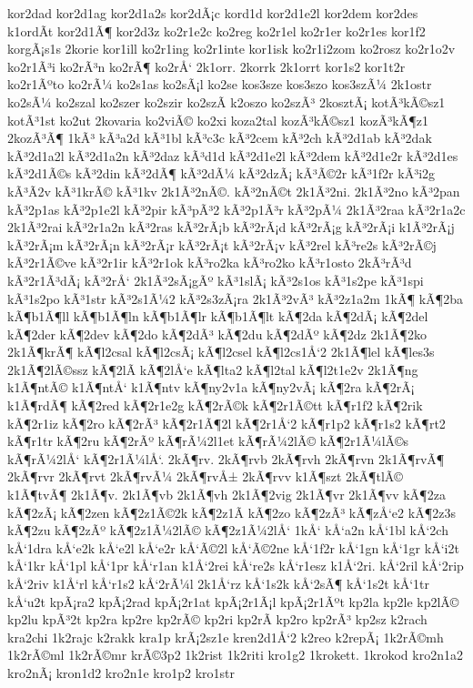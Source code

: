 {kor2dad
kor2d1ag
kor2d1a2s
kor2dÃ¡c
kord1d
kor2d1e2l
kor2dem
kor2des
k1ordÃ­t
kor2d1Ã¶
kor2d3z
ko2r1e2c
ko2reg
ko2r1el
ko2r1er
ko2r1es
kor1f2
korgÃ¡s1s
2korie
kor1ill
ko2r1ing
ko2r1inte
kor1isk
ko2r1i2zom
ko2rosz
ko2r1o2v
ko2r1Ã³i
ko2rÃ³n
ko2rÃ¶
ko2rÅ‘
2k1orr.
2korrk
2k1orrt
kor1s2
kor1t2r
ko2r1Ãºto
ko2rÃ¼
ko2s1as
ko2sÃ¡l
ko2se
kos3sze
kos3szo
kos3szÃ¼
2k1ostr
ko2sÃ¼
ko2szal
ko2szer
ko2szir
ko2szÃ­
k2oszo
ko2szÃ³
2kosztÃ¡
kotÃ³kÃ©sz1
kotÃ³1st
ko2ut
2kovaria
ko2viÃ©
ko2xi
koza2tal
kozÃ³kÃ©sz1
kozÃ³kÃ¶z1
2kozÃ³Ã¶
1kÃ³
kÃ³a2d
kÃ³1bl
kÃ³c3c
kÃ³2cem
kÃ³2ch
kÃ³2d1ab
kÃ³2dak
kÃ³2d1a2l
kÃ³2d1a2n
kÃ³2daz
kÃ³d1d
kÃ³2d1e2l
kÃ³2dem
kÃ³2d1e2r
kÃ³2d1es
kÃ³2d1Ã©s
kÃ³2din
kÃ³2dÃ¶
kÃ³2dÃ¼
kÃ³2dzÃ¡
kÃ³Ã©2r
kÃ³1f2r
kÃ³i2g
kÃ³Ã­2v
kÃ³1krÃ©
kÃ³1kv
2k1Ã³2nÃ©.
kÃ³2nÃ©t
2k1Ã³2ni.
2k1Ã³2no
kÃ³2pan
kÃ³2p1as
kÃ³2p1e2l
kÃ³2pir
kÃ³pÃ³2
kÃ³2p1Ã³r
kÃ³2pÃ¼
2k1Ã³2raa
kÃ³2r1a2c
2k1Ã³2rai
kÃ³2r1a2n
kÃ³2ras
kÃ³2rÃ¡b
kÃ³2rÃ¡d
kÃ³2rÃ¡g
kÃ³2rÃ¡i
k1Ã³2rÃ¡j
kÃ³2rÃ¡m
kÃ³2rÃ¡n
kÃ³2rÃ¡r
kÃ³2rÃ¡t
kÃ³2rÃ¡v
kÃ³2rel
kÃ³re2s
kÃ³2rÃ©j
kÃ³2r1Ã©ve
kÃ³2r1ir
kÃ³2r1ok
kÃ³ro2ka
kÃ³ro2ko
kÃ³r1osto
2kÃ³rÃ³d
kÃ³2r1Ã³dÃ¡
kÃ³2rÅ‘
2k1Ã³2sÃ¡gÃº
kÃ³1slÃ¡
kÃ³2s1os
kÃ³1s2pe
kÃ³1spi
kÃ³1s2po
kÃ³1str
kÃ³2s1Ã¼2
kÃ³2s3zÃ¡ra
2k1Ã³2vÃ³
kÃ³2z1a2m
1kÃ¶
kÃ¶2ba
kÃ¶b1Ã¶ll
kÃ¶b1Ã¶ln
kÃ¶b1Ã¶lr
kÃ¶b1Ã¶lt
kÃ¶2da
kÃ¶2dÃ¡
kÃ¶2del
kÃ¶2der
kÃ¶2dev
kÃ¶2do
kÃ¶2dÃ³
kÃ¶2du
kÃ¶2dÃº
kÃ¶2dz
2k1Ã¶2ko
2k1Ã¶krÃ¶
kÃ¶l2csal
kÃ¶l2csÃ¡
kÃ¶l2csel
kÃ¶l2cs1Å‘2
2k1Ã¶lel
kÃ¶les3s
2k1Ã¶2lÃ©ssz
kÃ¶2lÃ­
kÃ¶2lÅ‘e
kÃ¶lta2
kÃ¶l2tal
kÃ¶l2t1e2v
2k1Ã¶ng
k1Ã¶ntÃ©
k1Ã¶ntÅ‘
k1Ã¶ntv
kÃ¶ny2v1a
kÃ¶ny2vÃ¡
kÃ¶2ra
kÃ¶2rÃ¡
k1Ã¶rdÃ¶
kÃ¶2red
kÃ¶2r1e2g
kÃ¶2rÃ©k
kÃ¶2r1Ã©tt
kÃ¶r1f2
kÃ¶2rik
kÃ¶2r1iz
kÃ¶2ro
kÃ¶2rÃ³
kÃ¶2r1Ã¶2l
kÃ¶2r1Å‘2
kÃ¶r1p2
kÃ¶r1s2
kÃ¶rt2
kÃ¶r1tr
kÃ¶2ru
kÃ¶2rÃº
kÃ¶rÃ¼2l1et
kÃ¶rÃ¼2lÃ©
kÃ¶2r1Ã¼lÃ©s
kÃ¶rÃ¼2lÅ‘
kÃ¶2r1Ã¼lÅ‘.
2kÃ¶rv.
2kÃ¶rvb
2kÃ¶rvh
2kÃ¶rvn
2k1Ã¶rvÃ¶
2kÃ¶rvr
2kÃ¶rvt
2kÃ¶rvÃ¼
2kÃ¶rvÅ±
2kÃ¶rvv
k1Ã¶szt
2kÃ¶tlÃ©
k1Ã¶tvÃ¶
2k1Ã¶v.
2k1Ã¶vb
2k1Ã¶vh
2k1Ã¶2vig
2k1Ã¶vr
2k1Ã¶vv
kÃ¶2za
kÃ¶2zÃ¡
kÃ¶2zen
kÃ¶2z1Ã©2k
kÃ¶2z1Ã­
kÃ¶2zo
kÃ¶2zÃ³
kÃ¶zÅ‘e2
kÃ¶2z3s
kÃ¶2zu
kÃ¶2zÃº
kÃ¶2z1Ã¼2lÃ©
kÃ¶2z1Ã¼2lÅ‘
1kÅ‘
kÅ‘a2n
kÅ‘1bl
kÅ‘2ch
kÅ‘1dra
kÅ‘e2k
kÅ‘e2l
kÅ‘e2r
kÅ‘Ã©2l
kÅ‘Ã©2ne
kÅ‘1f2r
kÅ‘1gn
kÅ‘1gr
kÅ‘i2t
kÅ‘1kr
kÅ‘1pl
kÅ‘1pr
kÅ‘r1an
k1Å‘2rei
kÅ‘re2s
kÅ‘r1esz
k1Å‘2ri.
kÅ‘2ril
kÅ‘2rip
kÅ‘2riv
k1Å‘rl
kÅ‘r1s2
kÅ‘2rÃ¼l
2k1Å‘rz
kÅ‘1s2k
kÅ‘2sÃ¶
kÅ‘1s2t
kÅ‘1tr
kÅ‘u2t
kpÃ¡ra2
kpÃ¡2rad
kpÃ¡2r1at
kpÃ¡2r1Ã¡l
kpÃ¡2r1Ãºt
kp2la
kp2le
kp2lÃ©
kp2lu
kpÃ³2t
kp2ra
kp2re
kp2rÃ©
kp2ri
kp2rÃ­
kp2ro
kp2rÃ³
kp2sz
k2rach
kra2chi
1k2rajc
k2rakk
kra1p
krÃ¡2sz1e
kren2d1Å‘2
k2reo
k2repÃ¡
1k2rÃ©mh
1k2rÃ©ml
1k2rÃ©mr
krÃ©3p2
1k2rist
1k2riti
kro1g2
1krokett.
1krokod
kro2n1a2
kro2nÃ¡
kron1d2
kro2n1e
kro1p2
kro1str
}
